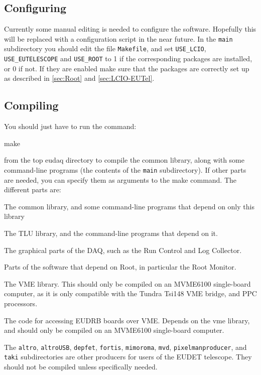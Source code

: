 \subsection{Configuring}
Currently some manual editing is needed to configure the software.
Hopefully this will be replaced with a configuration script in the near future.
In the \texttt{main} subdirectory you should edit the file \texttt{Makefile},
and set \texttt{USE\_LCIO}, \texttt{USE\_EUTELESCOPE} and \texttt{USE\_ROOT}
to 1 if the corresponding packages are installed, or 0 if not.
If they are enabled make sure that the packages are correctly set up
as described in \autoref{sec:Root} and \autoref{sec:LCIO-EUTel}.

\subsection{Compiling}
You should just have to run the command:
\begin{listing}[mybash]
make
\end{listing}

from the top eudaq directory to compile the common library,
along with some command-line programs (the contents of the \texttt{main} subdirectory).
If other parts are needed, you can specify them as arguments to the make command.
The different parts are:
\begin{description}

The common library, and some command-line programs that depend on only this library

The TLU library, and the command-line programs that depend on it.

The graphical parts of the DAQ, such as the Run Control and Log Collector.

Parts of the software that depend on Root, in particular the Root Monitor.

The VME library. This should only be compiled on an MVME6100 single-board computer,
as it is only compatible with the Tundra Tsi148 VME bridge, and PPC processors. 

The code for accessing EUDRB boards over VME.
Depends on the vme library, and should only be compiled on an MVME6100 single-board computer.

\end{description}

The \texttt{altro}, \texttt{altroUSB}, \texttt{depfet}, \texttt{fortis}, \texttt{mimoroma}, \texttt{mvd}, \texttt{pixelmanproducer},
and \texttt{taki} subdirectories are other producers for users of the EUDET telescope.
They should not be compiled unless specifically needed.

